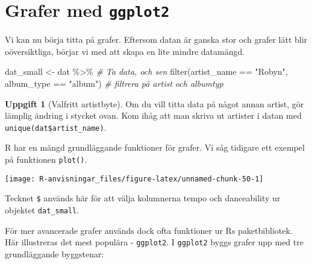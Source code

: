 \documentclass[
]{book}
\newenvironment{Shaded}{\begin{snugshade}}{\end{snugshade}}
\newcommand{\CommentTok}[1]{\textcolor[rgb]{0.56,0.35,0.01}{\textit{#1}}}
\newcommand{\FunctionTok}[1]{\textcolor[rgb]{0.00,0.00,0.00}{#1}}
\newcommand{\NormalTok}[1]{#1}
\newcommand{\OtherTok}[1]{\textcolor[rgb]{0.56,0.35,0.01}{#1}}
\newcommand{\SpecialCharTok}[1]{\textcolor[rgb]{0.00,0.00,0.00}{#1}}
\newcommand{\StringTok}[1]{\textcolor[rgb]{0.31,0.60,0.02}{#1}}
\theoremstyle{definition}
\theoremstyle{definition}
\theoremstyle{definition}
\newtheorem{exercise}{Uppgift}[chapter]
\theoremstyle{definition}
\theoremstyle{remark}
\begin{document}
\hypertarget{grafer-med-ggplot2}{%
\section{\texorpdfstring{Grafer med \texttt{ggplot2}}{Grafer med ggplot2}}\label{grafer-med-ggplot2}}

Vi kan nu börja titta på grafer. Eftersom datan är ganska stor och grafer lätt blir oöversiktliga, börjar vi med att skapa en lite mindre datamängd.

\begin{Shaded}
\begin{Highlighting}[]
\NormalTok{dat\_small }\OtherTok{\textless{}{-}}\NormalTok{ dat }\SpecialCharTok{\%\textgreater{}\%}                                      \CommentTok{\# Ta data, och sen}
  \FunctionTok{filter}\NormalTok{(artist\_name }\SpecialCharTok{==} \StringTok{"Robyn"}\NormalTok{, album\_type }\SpecialCharTok{==} \StringTok{"album"}\NormalTok{)   }\CommentTok{\# filtrera på artist och albumtyp}
\end{Highlighting}
\end{Shaded}

\begin{exercise}[Valfritt artistbyte]
Om du vill titta data på något annan artist, gör lämplig ändring i stycket ovan. Kom ihåg att man skriva ut artister i datan med \texttt{unique(dat\$artist\_name)}.
\end{exercise}

R har en mängd grundläggande funktioner för grafer. Vi såg tidigare ett exempel på funktionen \texttt{plot()}.

\begin{Shaded}
\end{Shaded}

\begin{center}\texttt{[image: R-anvisningar\_files/figure-latex/unnamed-chunk-50-1]} \end{center}

Tecknet \texttt{\$} används här för att välja kolumnerna tempo och danceability ur objektet \texttt{dat\_small}.

För mer avancerade grafer används dock ofta funktioner ur Rs paketbibliotek. Här illustreras det mest populära - \texttt{ggplot2}. I \texttt{ggplot2} byggs grafer upp med tre grundläggande byggstenar:
\end{document}
